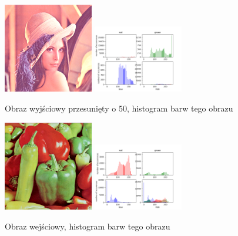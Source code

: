 \documentclass[final,a4paper,openany,12pt]{mwbk}
\begin{document}
\begin{figure}[H]
	\begin{center}
		\includegraphics[width=0.35\textwidth]{lena_color_moveHist_result}
		\includegraphics[width=0.35\textwidth]{lena_color_moveHist_histogram}
	\end{center}
	\caption{Obraz wyjściowy przesunięty o 50, histogram barw tego obrazu}
\end{figure}

\begin{figure}[H]
	\begin{center}
		\includegraphics[width=0.35\textwidth]{peppers_color}
		\includegraphics[width=0.35\textwidth]{peppers_color_histogram}
	\end{center}
	\caption{Obraz wejściowy, histogram barw tego obrazu}
\end{figure}
\end{document}
